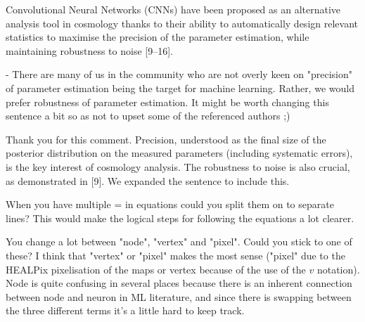 \documentclass[12pt,a4paper]{article}
\newcommand{\nati}[1]{{\color[rgb]{.1,.6,.1}{NP: #1}}}
\newcommand{\TK}[1]{{\color{red}{TK: #1}}}
\newcommand{\todo}[1]{{\color[rgb]{.6,.1,.6}{TODO: #1}}}
\newcommand{\1}{\b{1}}              %
\newcommand{\0}{\b{0}}              %
\begin{document}
\begin{mdframed}[style=comment]
Convolutional Neural Networks (CNNs) have been proposed as an alternative analysis tool in cosmology thanks to their ability to automatically design relevant statistics to maximise the precision of the parameter estimation, while maintaining robustness to noise [9–16].

- There are many of us in the community who are not overly keen on "precision" of parameter estimation being the target for machine learning. Rather, we would prefer robustness of parameter estimation. It might be worth changing this sentence a bit so as not to upset some of the referenced authors ;)
\end{mdframed}
Thank you for this comment. Precision, understood as the final size of the posterior distribution on the measured parameters (including systematic errors), is the key interest of cosmology analysis.
The robustness to noise is also crucial, as demonstrated in [9]. We expanded the sentence to include this.




\begin{mdframed}[style=comment]
When you have multiple = in equations could you split them on to separate lines? This would make the logical steps for following the equations a lot clearer.
\end{mdframed}
\todo{Assigned: @tomek}
\nati{I personally think it is better without separating the lines}
\TK{Thank you for the suggestion, normally we would adopt it, but the paper is already quite long, and breaking up the lines in equations would make it even longer. So we decided against it.}

\begin{mdframed}[style=comment]
You change a lot between "node", "vertex" and "pixel". Could you stick to one of these? I think that "vertex" or "pixel" makes the most sense ("pixel" due to the HEALPix pixelisation of the maps or vertex because of the use of the $v$ notation). Node is quite confusing in several places because there is an inherent connection between node and neuron in ML literature, and since there is swapping between the three different terms it's a little hard to keep track.
\end{mdframed}
\todo{Assigned: @all}
\nati{What do you think? This avoid repetition. But we could be more consistent...}
\TK{Agreed. Do you want to make the change @nati?}
\end{document}
